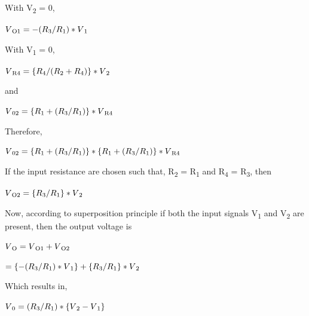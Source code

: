 \documentclass[11pt,a4paper,oneside]{article}
\begin{document}
With V\textsubscript{2} = 0,

\begin{center}
$V\textsubscript{O1} = -(R\textsubscript{3}/R\textsubscript{1})*V\textsubscript{1}$
\end{center}

With V\textsubscript{1} = 0,

\begin{center}
$V\textsubscript{R4} = \{R\textsubscript{4}/(R\textsubscript{2}+R\textsubscript{4})\}*V\textsubscript{2}$
\end{center}

\begin{center}
	and
\end{center}

\begin{center}
$V\textsubscript{02} = \{R\textsubscript{1}+(R\textsubscript{3}/R\textsubscript{1})\}*V\textsubscript{R4}$
\end{center}

Therefore,

\begin{center}
$V\textsubscript{02} = \{R\textsubscript{1}+(R\textsubscript{3}/R\textsubscript{1})\}*\{R\textsubscript{1}+(R\textsubscript{3}/R\textsubscript{1})\}*V\textsubscript{R4}$
\end{center}

If the input resistance are chosen such that, R\textsubscript{2} = R\textsubscript{1} and R\textsubscript{4} = R\textsubscript{3}, then

\begin{center}
$V\textsubscript{O2} = \{R\textsubscript{3}/R\textsubscript{1}\}*V\textsubscript{2}$
\end{center}

Now, according to superposition principle if both the input signals V\textsubscript{1} and V\textsubscript{2} are present, then the output voltage is

\begin{center}
$V\textsubscript{O} = V\textsubscript{O1} + V\textsubscript{O2}$
\end{center}

\begin{center}
$=\{-(R\textsubscript{3}/R\textsubscript{1}) * V\textsubscript{1}\} + \{R\textsubscript{3}/R\textsubscript{1}\}*V\textsubscript{2}$
\end{center}

Which results in,

\begin{center}
	$V\textsubscript{0} = (R\textsubscript{3}/R\textsubscript{1}) * \{V\textsubscript{2} - V\textsubscript{1}\}$
\end{center}
\end{document}
